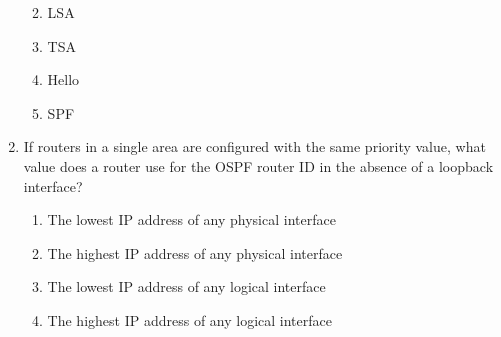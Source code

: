 \begin{enumerate}
  \begin{enumerate}
  \def\labelenumii{\Alph{enumii}.}
    \item
    LSA
  \item
    TSA
  \item
    Hello
  \item
    SPF
  \end{enumerate}
\item
  If routers in a single area are configured with the same priority
  value, what value does a router use for the OSPF router ID in the
  absence of a loopback interface?

  \begin{enumerate}
  \def\labelenumii{\Alph{enumii}.}
    \item
    The lowest IP address of any physical interface
  \item
    The highest IP address of any physical interface
  \item
    The lowest IP address of any logical interface
  \item
    The highest IP address of any logical interface
  \end{enumerate}
\end{enumerate}
